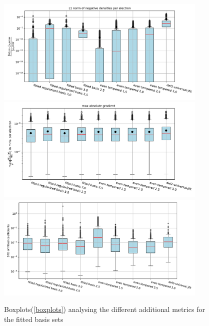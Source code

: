     \begin{figure}
    \centering
    \includegraphics[width=0.9\textwidth]{chapters/results/results_images/L1_negative_densities_on_hartree+external_MOFDFT_for_different_basis_sets}
    \includegraphics[width=0.9\textwidth]{chapters/results/results_images/max_abs_gradient_on_hartree+external_MOFDFT_for_different_basis_sets}
    \includegraphics[width=0.9\textwidth]{chapters/results/results_images/var_basis_sets}
    \caption{Boxplots(\ref{boxplots}) analysing the different additional metrics for the fitted basis sets}
\end{figure}

